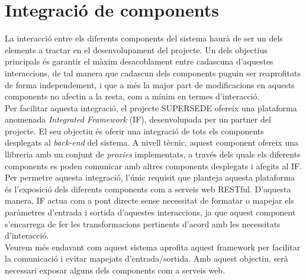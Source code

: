 \section{Integració de components}

La interacció entre els diferents components del sistema haurà de ser un dels elements a tractar en el desenvolupament del projecte. Un dels objectius principals és garantir el màxim desacoblament entre cadascuna d'aquestes interaccions, de tal manera que cadascun dels components puguin ser reaprofitats de forma independement, i que a més la major part de modificacions en aquests components no afectin a la resta, com a mínim en termes d'interacció.\\

Per facilitar aquesta integració, el projecte SUPERSEDE ofereix una plataforma anomenada \textit{Integrated Framework} (IF), desenvolupada per un partner del projecte. El seu objectiu és oferir una integració de tots els components desplegats al \textit{back-end} del sistema. A nivell tècnic, aquest component ofereix una llibreria amb un conjunt de \textit{proxies} implementats, a través dels quals els diferents components es poden comunicar amb altres components desplegats i afegits al IF.\\

Per permetre aquesta integració, l'únic requisit que planteja aquesta plataforma és l'exposició dels diferents components com a serveis web RESTful. D'aquesta manera, IF actua com a pont directe sense necessitat de formatar o mapejar els paràmetres d'entrada i sortida d'aquestes interaccions, ja que aquest component s'encarrega de fer les transformacions pertinents d'acord amb les necessitats d'interacció. \\

Veurem més endavant com aquest sistema aprofita aquest framework per facilitar la comunicació i evitar mapejats d'entrada/sortida. Amb aquest objectiu, serà necessari exposar alguns dels components com a serveis web.